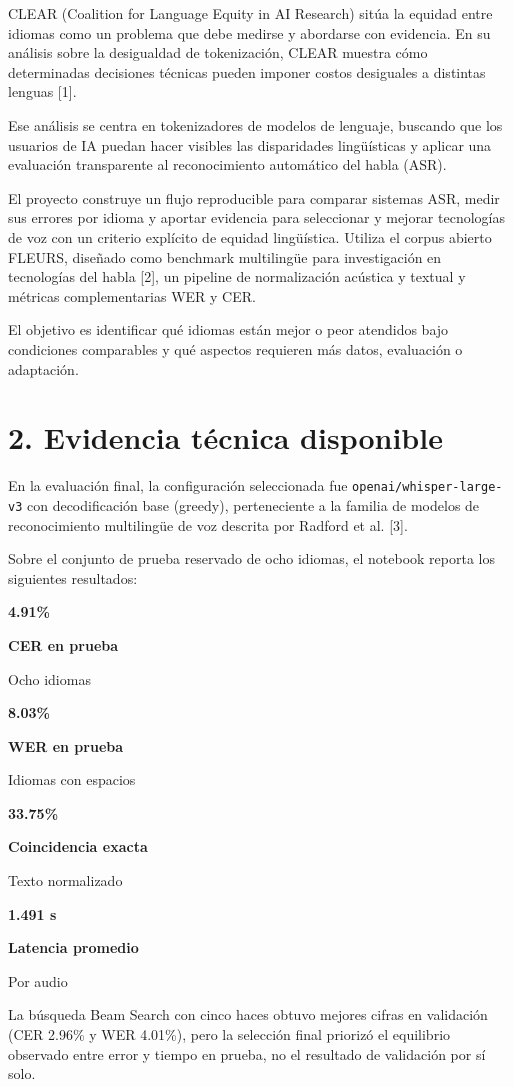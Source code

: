 \documentclass[letterpaper,11pt]{article}
\newcommand{\metric}[3]{%
\begin{minipage}[t]{0.235\linewidth}
\colorbox{gris}{%
\parbox[t]{0.91\linewidth}{%
\centering
\vspace{3pt}
{\Large\bfseries\color{azul}#1}\par
{\small\bfseries #2}\par
{\scriptsize #3}
\vspace{3pt}
}}
\end{minipage}
}
\begin{document}
CLEAR (Coalition for Language Equity
in AI Research) sitúa la equidad entre idiomas como un
problema que debe medirse y abordarse con evidencia.
En su análisis sobre la desigualdad de tokenización,
CLEAR muestra cómo determinadas decisiones técnicas
pueden imponer costos desiguales a distintas lenguas [1].

Ese análisis se centra en tokenizadores de modelos de lenguaje, 
buscando que los usuarios de IA puedan
hacer visibles las disparidades lingüísticas y aplicar
una evaluación transparente al reconocimiento automático
del habla (ASR).

El proyecto construye un flujo reproducible
para comparar sistemas ASR, medir sus errores por idioma
y aportar evidencia para seleccionar y mejorar tecnologías
de voz con un criterio explícito de equidad lingüística. Utiliza el corpus abierto FLEURS, diseñado como benchmark
multilingüe para investigación en tecnologías del habla [2],
un pipeline de normalización acústica y textual y métricas
complementarias WER y CER.

El objetivo es
identificar qué idiomas están mejor o peor atendidos bajo
condiciones comparables y qué aspectos requieren más datos,
evaluación o adaptación.

\section*{\color{azul}2. Evidencia técnica disponible}

En la evaluación final, la configuración seleccionada fue
\texttt{openai/whisper-large-v3} con decodificación base
(greedy), perteneciente a la familia de modelos de
reconocimiento multilingüe de voz descrita por
Radford et al. [3].

Sobre el conjunto de prueba reservado de ocho idiomas,
el notebook reporta los siguientes resultados:

\vspace{0.2cm}

\noindent
\metric{4.91\%}{CER en prueba}{Ocho idiomas}
\hfill
\metric{8.03\%}{WER en prueba}{Idiomas con espacios}
\hfill
\metric{33.75\%}{Coincidencia exacta}{Texto normalizado}
\hfill
\metric{1.491 s}{Latencia promedio}{Por audio}

\vspace{0.3cm}

La búsqueda Beam Search con cinco haces obtuvo mejores
cifras en validación (CER 2.96\% y WER 4.01\%), pero la
selección final priorizó el equilibrio observado entre
error y tiempo en prueba, no el resultado de validación
por sí solo.
\end{document}
